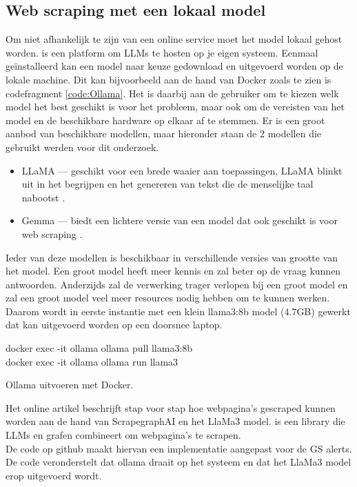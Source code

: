 \subsection{Web scraping met een lokaal model}
Om niet afhankelijk te zijn van een online service moet het model lokaal gehost worden. \textcite{Ollama2025} is een platform om LLMs te hosten op je eigen systeem. Eenmaal geïnstalleerd kan een model naar keuze gedownload en uitgevoerd worden op de lokale machine.
Dit kan bijvoorbeeld aan de hand van Docker zoals te zien is codefragment \ref{code:Ollama}. Het is daarbij aan de gebruiker om te kiezen welk model het best geschikt is voor het probleem, maar ook om de vereisten van het model en de beschikbare hardware op elkaar af te stemmen. Er is een groot aanbod van beschikbare modellen, maar hieronder staan de 2 modellen die gebruikt werden voor dit onderzoek.
\begin{itemize}
    \item LLaMA — geschikt voor een brede waaier aan toepassingen, LLaMA blinkt uit in het begrijpen en het genereren van tekst die de menselijke taal nabootst \autocite{Llama32025}.
    \item Gemma — biedt een lichtere versie van een model dat ook geschikt is voor web scraping \autocite{Gemma32025}.
\end{itemize}
Ieder van deze modellen is beschikbaar in verschillende versies van grootte van het model. Een groot model heeft meer kennis en zal beter op de vraag kunnen antwoorden. Anderzijds zal de verwerking trager verlopen bij een groot model en zal een groot model veel meer resources nodig hebben om te kunnen werken.
Daarom wordt in eerste instantie met een klein llama3:8b model (4.7GB) gewerkt dat kan uitgevoerd worden op een doorsnee laptop.
\begin{listing}[h!]
    docker exec -it ollama ollama pull llama3:8b\\
    docker exec -it ollama ollama run llama3
    \caption[Ollama met Docker]{Ollama uitvoeren met Docker.}
    \label{code:Ollama}
\end{listing}
Het online artikel \textcite{Scrapegraphaillama2025} beschrijft stap voor stap hoe webpagina's gescraped kunnen worden aan de hand van ScrapegraphAI en het LlaMa3 model.
\textcite{ScrapeGraphAI2025} is een library die LLMs en grafen combineert om webpagina's te scrapen.\\
De code op github \textcite{Depaepeollama2025} maakt hiervan een implementatie aangepast voor de GS alerts. De code veronderstelt dat ollama draait op het systeem en dat het LlaMa3 model erop uitgevoerd wordt.
